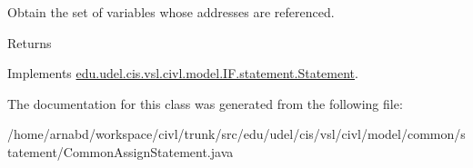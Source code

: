 Obtain the set of variables whose addresses are referenced. 

\begin{DoxyReturn}{Returns}

\end{DoxyReturn}


Implements \hyperlink{interfaceedu_1_1udel_1_1cis_1_1vsl_1_1civl_1_1model_1_1IF_1_1statement_1_1Statement_abe668e1bcb4297c9e6e7f8f65aeecfc2}{edu.\+udel.\+cis.\+vsl.\+civl.\+model.\+I\+F.\+statement.\+Statement}.



The documentation for this class was generated from the following file\+:\begin{DoxyCompactItemize}
\item 
/home/arnabd/workspace/civl/trunk/src/edu/udel/cis/vsl/civl/model/common/statement/Common\+Assign\+Statement.\+java\end{DoxyCompactItemize}
